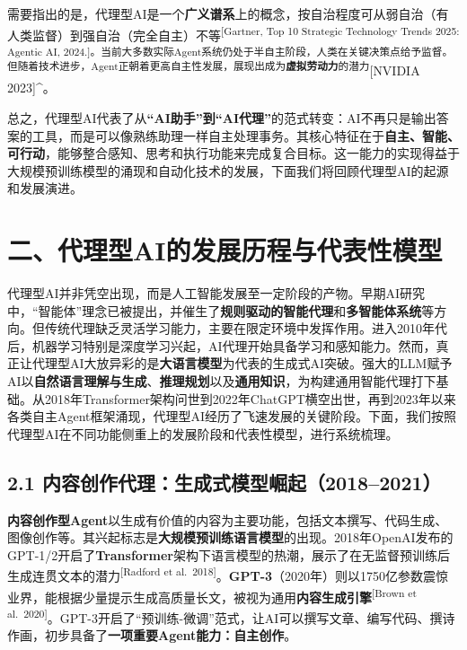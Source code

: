 \documentclass[
  letterpaper,
]{scrbook}
\begin{document}
需要指出的是，代理型AI是一个\textbf{广义谱系}上的概念，按自治程度可从弱自治（有人类监督）到强自治（完全自主）不等\textsuperscript{{[}Gartner,
Top 10 Strategic Technology Trends 2025: Agentic AI,
2024.{]}。当前大多数实际Agent系统仍处于半自主阶段，人类在关键决策点给予监督。但随着技术进步，Agent正朝着更高自主性发展，展现出成为\textbf{虚拟劳动力}的潜力}{[}NVIDIA
2023{]}\^{}。

总之，代理型AI代表了从\textbf{``AI助手''到``AI代理''}的范式转变：AI不再只是输出答案的工具，而是可以像熟练助理一样自主处理事务。其核心特征在于\textbf{自主、智能、可行动}，能够整合感知、思考和执行功能来完成复合目标。这一能力的实现得益于大规模预训练模型的涌现和自动化技术的发展，下面我们将回顾代理型AI的起源和发展演进。

\section{二、代理型AI的发展历程与代表性模型}\label{ux4e8cux4ee3ux7406ux578baiux7684ux53d1ux5c55ux5386ux7a0bux4e0eux4ee3ux8868ux6027ux6a21ux578b}

代理型AI并非凭空出现，而是人工智能发展至一定阶段的产物。早期AI研究中，``智能体''理念已被提出，并催生了\textbf{规则驱动的智能代理}和\textbf{多智能体系统}等方向。但传统代理缺乏灵活学习能力，主要在限定环境中发挥作用。进入2010年代后，机器学习特别是深度学习兴起，AI代理开始具备学习和感知能力。然而，真正让代理型AI大放异彩的是\textbf{大语言模型}为代表的生成式AI突破。强大的LLM赋予AI以\textbf{自然语言理解与生成}、\textbf{推理规划}以及\textbf{通用知识}，为构建通用智能代理打下基础。从2018年Transformer架构问世到2022年ChatGPT横空出世，再到2023年以来各类自主Agent框架涌现，代理型AI经历了飞速发展的关键阶段。下面，我们按照代理型AI在不同功能侧重上的发展阶段和代表性模型，进行系统梳理。

\subsection{2.1
内容创作代理：生成式模型崛起（2018--2021）}\label{ux5185ux5bb9ux521bux4f5cux4ee3ux7406ux751fux6210ux5f0fux6a21ux578bux5d1bux8d7720182021}

\textbf{内容创作型Agent}以生成有价值的内容为主要功能，包括文本撰写、代码生成、图像创作等。其兴起标志是\textbf{大规模预训练语言模型}的出现。2018年OpenAI发布的GPT-1/2开启了\textbf{Transformer}架构下语言模型的热潮，展示了在无监督预训练后生成连贯文本的潜力\textsuperscript{{[}Radford
et
al.~2018{]}}。\textbf{GPT-3}（2020年）则以1750亿参数震惊业界，能根据少量提示生成高质量长文，被视为通用\textbf{内容生成引擎}\textsuperscript{{[}Brown
et
al.~2020{]}}。GPT-3开启了``预训练-微调''范式，让AI可以撰写文章、编写代码、撰诗作画，初步具备了\textbf{一项重要Agent能力：自主创作}。
\end{document}
